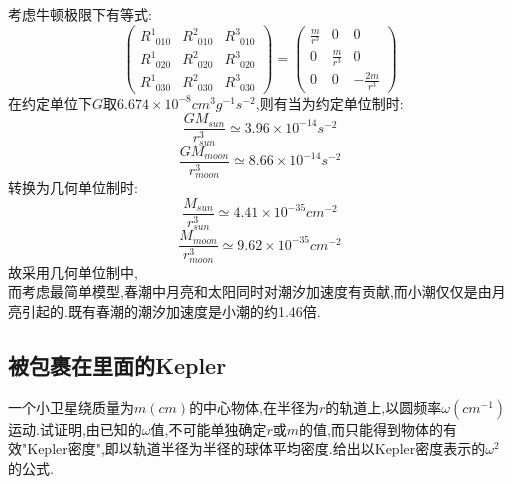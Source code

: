 \documentclass[12pt]{report}
\begin{document}
考虑牛顿极限下有等式:
\begin{displaymath}
\begin{pmatrix}
R^{1}_{\phantom 0010} &R^{2}_{\phantom 0010} &R^{3}_{\phantom 0010}\\
R^{1}_{\phantom 0020} &R^{2}_{\phantom 0020} &R^{3}_{\phantom 0020}\\
R^{1}_{\phantom 0030} &R^{2}_{\phantom 0030} &R^{3}_{\phantom 0030}
\end{pmatrix}
=
\begin{pmatrix}
\frac{m}{r^{3}} &0 &0\\
0 &\frac{m}{r^{3}}  &0 \\
0 &0 &-\frac{2m}{r^{3}} 
\end{pmatrix}
\end{displaymath}
在约定单位下$G$取$6.674\times 10^{-8}cm^{3}g^{-1}s^{-2}$,则有当为约定单位制时:
\begin{displaymath}
\frac{GM_{sun}}{r_{sun}^{3}}\simeq 3.96\times 10^{-14}s^{-2}
\end{displaymath}
\begin{displaymath}
\frac{GM_{moon}}{r_{moon}^{3}}\simeq 8.66\times 10^{-14}s^{-2}
\end{displaymath}
转换为几何单位制时:
\begin{displaymath}
\frac{M_{sun}}{r_{sun}^{3}}\simeq 4.41\times 10^{-35}cm^{-2}
\end{displaymath}
\begin{displaymath}
\frac{M_{moon}}{r_{moon}^{3}}\simeq 9.62\times 10^{-35}cm^{-2}
\end{displaymath}
故采用几何单位制中,\\

而考虑最简单模型,春潮中月亮和太阳同时对潮汐加速度有贡献,而小潮仅仅是由月亮引起的.既有春潮的潮汐加速度是小潮的约1.46倍.

\newpage
\subsection{被包裹在里面的Kepler}
一个小卫星绕质量为$m(cm)$的中心物体,在半径为$r$的轨道上,以圆频率$\omega(cm^{-1})$运动.试证明,由已知的$\omega$值,不可能单独确定$r$或$m$的值,而只能得到物体的有效"Kepler密度",即以轨道半径为半径的球体平均密度.给出以Kepler密度表示的$\omega^{2}$的公式.
\end{document}
